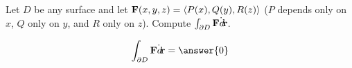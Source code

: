 \documentclass{ximera}
\author{David Guichard \and Neal Koblitz \and H. Jerome Keisler \and Albert Scheller \and Barry Balof \and Mike Wills \and Matthew Carr}
\begin{document}
\begin{exercise}




Let $D$ be any surface and let $\mathbf{F}(x,y,z)=\left\langle P(x),Q(y),R(z)\right\rangle$ ($P$ depends only on $x$, $Q$ only on $y$, and $R$ only on $z$). Compute $\int_{\partial D}\mathbf{F}\dot{\mathop{}\!d\!}\mathbf{r}$.
\begin{prompt}
\[
\int_{\partial D}\vec{F}\dot\d\vec{r}=\answer{0}
\]
\end{prompt}


\end{exercise}
\end{document}
